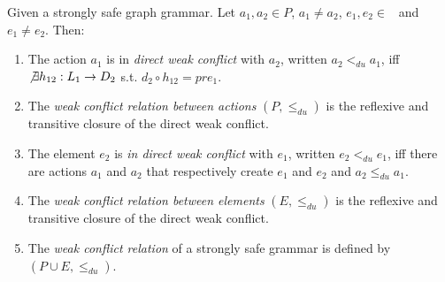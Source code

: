 \begin{definition}\label{def:unconditional-conflict} Given \doublyTypedGraphGrammarCore{} a strongly safe graph grammar. Let $a_1, a_2 \in P$, $a_1 \ne a_2$, \mbox{$e_1, e_2 \in $ \coreGraph{}} and $e_1 \ne e_2$. Then: 

  \begin{enumerate}
    \item The action $a_1$ is in \emph{direct weak conflict} with $a_2$, written $a_2 <_{du} a_1$, iff \mbox{$\not\exists h_{12} : L_1 \rightarrow D_2$} s.t. \mbox{$d_2 \circ h_{12} = pre_1$}.

   \item The \emph{weak conflict relation between actions} $(P,\leq_{du})$ is the reflexive and transitive closure of the direct weak conflict.
   \item The element $e_2$ is \emph{in direct weak conflict} with $e_1$, written $e_2 <_{du} e_1$, iff there are actions $a_1$ and $a_2$ that respectively create $e_1$ and $e_2$ and $a_2 \leq_{du} a_1$.
   \item The \emph{weak conflict relation between elements} $(E, \leq_{du})$ is the reflexive and transitive closure of the direct weak conflict.
   \item The \emph{weak conflict relation} of a strongly safe grammar is defined by $(P \cup E, \leq_{du})$.

  \end{enumerate}
\end{definition}

